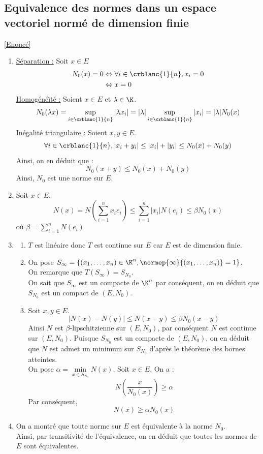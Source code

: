 \documentclass{book}
\begin{document}
	\subsection{Equivalence des normes dans un espace vectoriel normé de dimension finie}\label{sec:equivalence-des-normes-dans-un-espace-vectoriel-norme-de-dimension-finie}
		\textcolor{blue}{\hyperref[Equivalence des normes dans un espace vectoriel normée de dimension finie]{[Enoncé]}}\\
		\begin{enumerate}
			\item \underline{Séparation :} Soit $x\in E$ \begin{align*}
				N_0(x)=0 &\Leftrightarrow \forall i\in\crblanc{1}{n}, x_i=0\\
				&\Leftrightarrow x=0
			\end{align*}
			\underline{Homogénéïté :} Soient $x\in E$ et $\lambda\in\K$.\\
			\[N_0(\lambda x)=\sup_{i\in\crblanc{1}{n}}|\lambda x_i|=|\lambda|\sup_{i\in\crblanc{1}{n}}|x_i|=|\lambda|N_0(x)\]
			\underline{Inégalité triangulaire :} Soient $x,y\in E$.
			\[\forall i\in\crblanc{1}{n}, |x_i+y_i|\leq |x_i|+|y_i|\leq N_0(x)+N_0(y)\]
			Ainsi, on en déduit que :
			\[N_0(x+y)\leq N_0(x)+N_0(y)\]
			Ainsi, $N_0$ est une norme sur $E$.
			\item Soit $x\in E$.\\
			\[N(x)=N\left(\sum_{i=1}^{n}x_ie_i\right)\leq \sum_{i=1}^{n}|x_i|N(e_i)\leq \beta N_0(x)\]
			où $\beta=\sum_{i=1}^{n}N(e_i)$
			\item \begin{enumerate}[label=\alph*.]
				\item $T$ est linéaire donc $T$ est continue sur $E$ car $E$ est de dimension finie.
				\item  On pose $S_{\infty}=\{(x_1,\dots,x_n)\in\K^n, \normep{\infty}{(x_1,\dots,x_n)}=1\}$.\\
				On remarque que $T(S_{\infty})=S_{N_0}$.\\
				On sait que $S_\infty$ est un compacte de $\K^n$ par conséquent, on en déduit que $S_{N_0}$ est un compact de $(E,N_0)$.
				\item Soit $x,y\in E$.\\
				\[|N(x)-N(y)|\leq N(x-y)\leq \beta N_0(x-y)\]
				Ainsi $N$ est $\beta$-lipschitzienne sur $(E,N_0)$, par conséquent $N$ est continue sur $(E,N_0)$.
				Puisque $S_{N_0}$ est un compacte de $(E,N_0)$, on en déduit que $N$ est admet un minimum sur $S_{N_0}$ d'après le théorème des bornes atteintes.\\
				On pose $\alpha=\min\limits_{x\in S_{N_0}} N(x)$.
				Soit $x\in E$. On a :
				\[N\left(\frac{x}{N_0(x)}\right)\geq \alpha\]
				Par conséquent, \[N(x)\geq \alpha N_0(x)\]
			\end{enumerate}
			\item On a montré que toute norme sur $E$ est équivalente à la norme $N_0$.\\
			Ainsi, par transitivité de l'équivalence, on en déduit que toutes les normes de $E$ sont équivalentes.
		\end{enumerate}
\end{document}
